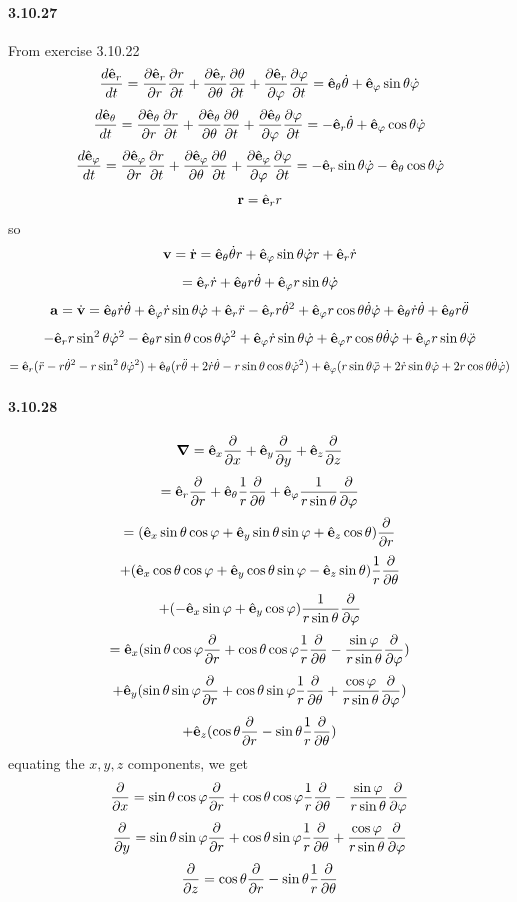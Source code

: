 \documentclass[a4paper]{article}
\begin{document}
\paragraph{3.10.27}
From exercise 3.10.22
\[
\frac{d\VE_r}{dt}=\pdv{\VE_r}{r}\pdv{r}{t}+\pdv{\VE_r}{\theta}\pdv{\theta}{t}+\pdv{\VE_r}{\varphi}\pdv{\varphi}{t}=\VE_\theta\dot{\theta}+\VE_\varphi\sin\theta\dot{\varphi}
\]
\[
\frac{d\VE_\theta}{dt}=\pdv{\VE_\theta}{r}\pdv{r}{t}+\pdv{\VE_\theta}{\theta}\pdv{\theta}{t}+\pdv{\VE_\theta}{\varphi}\pdv{\varphi}{t}=-\VE_r\dot{\theta}+\VE_\varphi\cos\theta\dot{\varphi}
\]
\[
\frac{d\VE_\varphi}{dt}=\pdv{\VE_\varphi}{r}\pdv{r}{t}+\pdv{\VE_\varphi}{\theta}\pdv{\theta}{t}+\pdv{\VE_\varphi}{\varphi}\pdv{\varphi}{t}=-\VE_r\sin\theta\dot{\varphi}-\VE_\theta\cos\theta\dot{\varphi}
\]
\[
\V{r}=\VE_r r
\]
so
\[
\V{v}=\dot{\V{r}}=\VE_\theta\dot{\theta}r+\VE_\varphi\sin\theta\dot{\varphi}r+\VE_r\dot{r}
\]
\[
=\VE_r\dot{r}+\VE_\theta r\dot{\theta}+\VE_\varphi r\sin\theta\dot{\varphi}
\]
\[
\V{a}=\dot{\V{v}}=\VE_\theta\dot{r}\dot{\theta}+\VE_\varphi\dot{r}\sin\theta\dot{\varphi}+\VE_r\Ddot{r}-\VE_r r{\dot{\theta}}^2+\VE_\varphi r\cos\theta\dot{\theta}\dot{\varphi}+\VE_\theta\dot{r}\dot{\theta}+\VE_\theta r\Ddot{\theta}\]
\[-\VE_r r\sin^2\theta{\dot{\varphi}}^2-\VE_\theta r\sin\theta\cos\theta{\dot{\varphi}}^2+\VE_\varphi\dot{r}\sin\theta\dot{\varphi}+\VE_\varphi r\cos\theta\dot{\theta}\dot{\varphi}+\VE_\varphi r\sin\theta\Ddot{\varphi}
\]
\[
=\VE_r(\Ddot{r}-r{\dot{\theta}}^2-r\sin^2\theta{\dot{\varphi}}^2)+\VE_\theta(r\Ddot{\theta}+2\dot{r}\dot{\theta}-r\sin\theta\cos\theta{\dot{\varphi}}^2)+\VE_\varphi(r\sin\theta\Ddot{\varphi}+2\dot{r}\sin\theta\dot{\varphi}+2r\cos\theta\dot{\theta}\dot{\varphi})
\]

\paragraph{3.10.28}
\[
\del=\VE_x\pdv{}{x}+\VE_y\pdv{}{y}+\VE_z\pdv{}{z}
\]
\[
=\VE_r\pdv{}{r}+\VE_\theta\frac{1}{r}\pdv{}{\theta}+\VE_\varphi\frac{1}{r\sin\theta}\pdv{}{\varphi}
\]
\[
=(\VE_x\sin\theta\cos\varphi+\VE_y\sin\theta\sin\varphi+\VE_z\cos\theta)\pdv{}{r}
\]
\[
+(\VE_x\cos\theta\cos\varphi+\VE_y\cos\theta\sin\varphi-\VE_z\sin\theta)\frac{1}{r}\pdv{}{\theta}
\]
\[
+(-\VE_x\sin\varphi+\VE_y\cos\varphi)\frac{1}{r\sin\theta}\pdv{}{\varphi}
\]
\[
=\VE_x(\sin\theta\cos\varphi\pdv{}{r}+\cos\theta\cos\varphi\frac{1}{r}\pdv{}{\theta}-\frac{\sin\varphi}{r\sin\theta}\pdv{}{\varphi})
\]
\[
+\VE_y(\sin\theta\sin\varphi\pdv{}{r}+\cos\theta\sin\varphi\frac{1}{r}\pdv{}{\theta}+\frac{\cos\varphi}{r\sin\theta}\pdv{}{\varphi})
\]
\[
+\VE_z(\cos\theta\pdv{}{r}-\sin\theta\frac{1}{r}\pdv{}{\theta})
\]
equating the $x,y,z$ components, we get
\[
\pdv{}{x}=\sin\theta\cos\varphi\pdv{}{r}+\cos\theta\cos\varphi\frac{1}{r}\pdv{}{\theta}-\frac{\sin\varphi}{r\sin\theta}\pdv{}{\varphi}
\]
\[
\pdv{}{y}=\sin\theta\sin\varphi\pdv{}{r}+\cos\theta\sin\varphi\frac{1}{r}\pdv{}{\theta}+\frac{\cos\varphi}{r\sin\theta}\pdv{}{\varphi}
\]
\[
\pdv{}{z}=\cos\theta\pdv{}{r}-\sin\theta\frac{1}{r}\pdv{}{\theta}
\]
\end{document}
